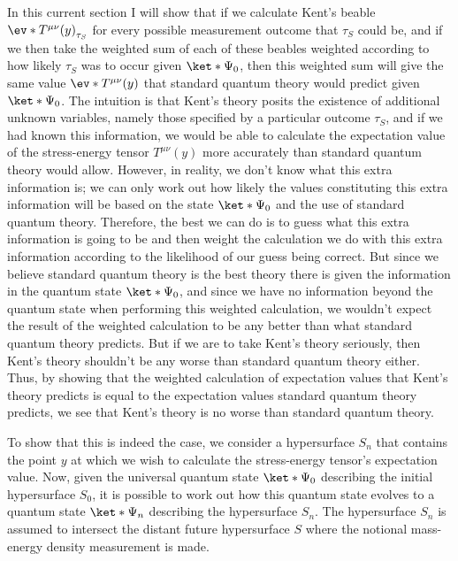 \documentclass[12pt]{report}
\begin{document}
In this current section I will show that if we calculate Kent's beable $\ev*{T^{\mu\nu}(y)}_{\tau_S}$ for every possible measurement outcome that $\tau_S$ could be,  and if we then take the weighted sum of each of these beables weighted according to how likely $\tau_S$ was to occur given $\ket*{\Psi_0}$, then this weighted sum will give the same value $\ev*{T^{\mu\nu}(y)}$ that standard quantum theory would predict given $\ket*{\Psi_0}$. The intuition is that Kent's theory posits the existence of additional unknown variables, namely those specified by a particular outcome $\tau_S$, and if we had known this information, we would be able to calculate the expectation value of the stress-energy tensor $T^{\mu\nu}(y)$ more accurately than standard quantum theory would allow. However, in reality, we don't know what this extra information is; we can only work out how likely the values constituting this extra information will be based on the state $\ket*{\Psi_0}$ and the use of standard quantum theory. Therefore, the best we can do is to guess what this extra information is going to be and then weight the calculation we do with this extra information according to the likelihood of our guess being correct. But since we believe standard quantum theory is the best theory there is given the information in the quantum state $\ket*{\Psi_0}$, and since we have no information beyond the quantum state when performing this weighted calculation, we wouldn't expect the result of the weighted calculation to be any better than what standard quantum theory predicts. But if we are to take Kent's theory seriously, then Kent's theory shouldn't be any worse than standard quantum theory either. Thus, by showing that the weighted calculation of expectation values that Kent's theory predicts is equal to the expectation values standard quantum theory predicts, we see that Kent's theory is no worse than standard quantum theory.

To show that this is indeed the case, we consider a hypersurface $S_n$ that contains the point $y$ at which we wish to calculate the stress-energy tensor's expectation value. Now, given the universal quantum state $\ket*{\Psi_0}$ describing the initial hypersurface $S_0$, it is possible to work out how this quantum state evolves to a quantum state $\ket*{\Psi_n}$ describing the hypersurface $S_n$. The hypersurface $S_n$ is assumed to intersect the distant future hypersurface $S$ where the notional mass-energy density measurement is made. 
\end{document}
